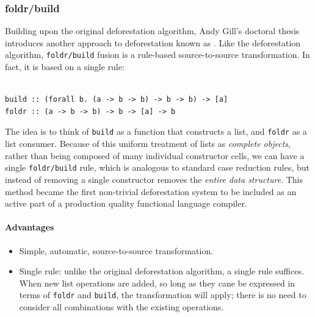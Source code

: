 \subsubsection{foldr/build}

Building upon the original deforestation algorithm, Andy
Gill's doctoral thesis introduces another approach to deforestation known as
 \cite{Gill:1996tf,Gill:1993}.
Like the deforestation algorithm, \texttt{foldr/build} fusion is a rule-based
source-to-source transformation. In fact, it is based on a single rule:
%
\begin{lstlisting}[style=Haskell,numbers=none,mathescape,caption={The \texttt{foldr/build} transformation}]
%\bf$\langle$ foldr/build fusion $\rangle$% forall g k z. foldr k z (build g) $\mapsto$ g k z

build :: (forall b. (a -> b -> b) -> b -> b) -> [a]
foldr :: (a -> b -> b) -> b -> [a] -> b
\end{lstlisting}

The idea is to think of \texttt{build} as a function that constructs a list, and
\texttt{foldr} as a list consumer. Because of this uniform treatment of lists as
\emph{complete objects}, rather than being composed of many individual
constructor cells, we can have a single \texttt{foldr/build} rule, which is
analogous to standard case reduction rules, but instead of removing a single
constructor removes the \emph{entire data structure}. This method became the
first non-trivial deforestation system to be included as an active part of a
production quality functional language compiler.

\paragraph{Advantages}
\begin{itemize}
    \item Simple, automatic, source-to-source transformation.


    \item Single rule: unlike the original deforestation algorithm, a single
        rule suffices. When new list operations are added, so long as they cane
        be expressed in terms of \texttt{foldr} and \texttt{build}, the
        transformation will apply; there is no need to consider all combinations
        with the existing operations.
\end{itemize}

